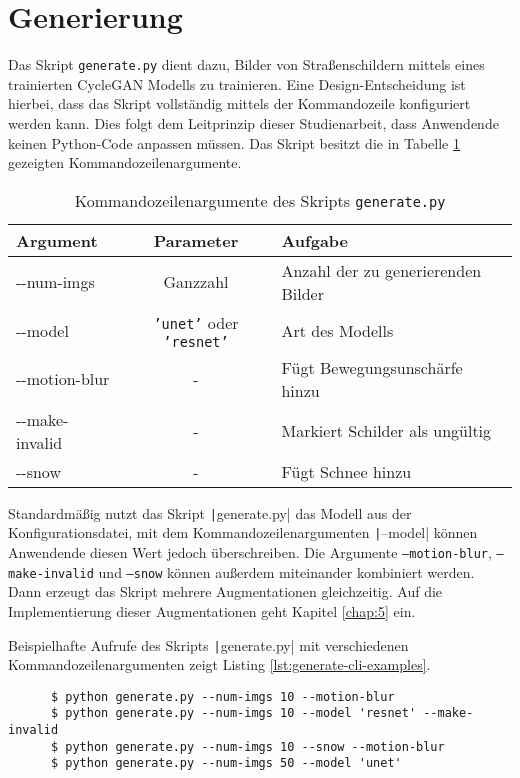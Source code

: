 \section{Generierung}
Das Skript \texttt{generate.py} dient dazu, Bilder von Straßenschildern mittels eines trainierten \ac{CycleGAN} Modells zu trainieren. Eine Design-Entscheidung ist hierbei, dass das Skript vollständig mittels der Kommandozeile konfiguriert werden kann. Dies folgt dem Leitprinzip dieser Studienarbeit, dass Anwendende keinen Python-Code anpassen müssen. Das Skript besitzt die in Tabelle \ref{tab:generate-cli} gezeigten Kommandozeilenargumente.
\begin{table}[H]
   \centering
   \begin{tabular}{|l|c|l|}
   \hline
   \textbf{Argument} & \textbf{Parameter} & \textbf{Aufgabe} \\ \hline \hline
   -{}-num-imgs & Ganzzahl & Anzahl der zu generierenden Bilder \\ \hline
   -{}-model & \texttt{'unet'} oder \texttt{'resnet'} & Art des Modells \\ \hline
   -{}-motion-blur & - & Fügt Bewegungsunschärfe hinzu \\ \hline
   -{}-make-invalid & - & Markiert Schilder als ungültig \\ \hline
   -{}-snow & - & Fügt Schnee hinzu \\
   \hline
   \end{tabular}
   \caption{Kommandozeilenargumente des Skripts \lstinline[language=python]{generate.py}}
   \label{tab:generate-cli}
\end{table}

Standardmäßig nutzt das Skript \texttt|generate.py| das Modell aus der Konfigurationsdatei, mit dem Kommandozeilenargumenten \texttt|--model| können Anwendende diesen Wert jedoch überschreiben. Die Argumente \texttt{--motion-blur}, \texttt{--make-invalid} und \texttt{--snow} können außerdem miteinander kombiniert werden. Dann erzeugt das Skript mehrere Augmentationen gleichzeitig. Auf die Implementierung dieser Augmentationen geht Kapitel \ref{chap:5} ein.

Beispielhafte Aufrufe des Skripts \texttt|generate.py| mit verschiedenen Kommandozeilenargumenten zeigt Listing \ref{lst:generate-cli-examples}.
\begin{samepage}
\begin{code}
   \begin{verbatim}
      $ python generate.py --num-imgs 10 --motion-blur
      $ python generate.py --num-imgs 10 --model 'resnet' --make-invalid
      $ python generate.py --num-imgs 10 --snow --motion-blur
      $ python generate.py --num-imgs 50 --model 'unet'
   \end{verbatim}
   \caption{Beispielaufrufe des Skripts \lstinline[language=python]{generate.py}}
   \label{lst:generate-cli-examples}
\end{code}
\end{samepage}

